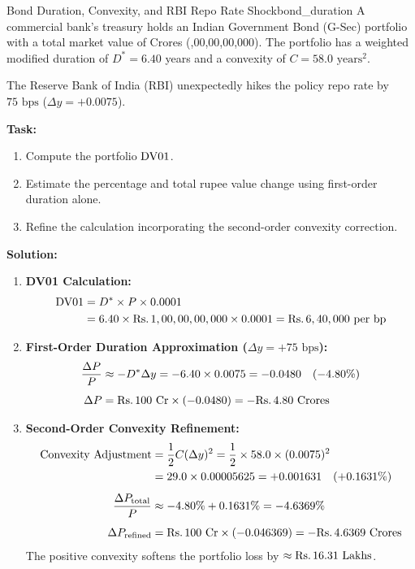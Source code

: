 \begin{example}{Bond Duration, Convexity, and RBI Repo Rate Shock}{bond_duration}
A commercial bank's treasury holds an Indian Government Bond (G-Sec) portfolio with a total market value of  Crores (,00,00,00,000). The portfolio has a weighted modified duration of $D^* = 6.40$ years and a convexity of $C = 58.0 \text{ years}^2$.

The Reserve Bank of India (RBI) unexpectedly hikes the policy repo rate by $75 \text{ bps}$ ($\Delta y = +0.0075$).

\textbf{Task:}
\begin{enumerate}[leftmargin=1.2em, itemsep=2pt]
    \item Compute the portfolio $\operatorname{DV01}$.
    \item Estimate the percentage and total rupee value change using first-order duration alone.
    \item Refine the calculation incorporating the second-order convexity correction.
\end{enumerate}

\textbf{Solution:}
\begin{enumerate}[leftmargin=1.2em, itemsep=2pt]
    \item \textbf{DV01 Calculation:}
    \begin{align*}
    \operatorname{DV01} &= D^* \times P \times 0.0001 \\
    &= 6.40 \times \text{Rs.}\, 1,00,00,00,000 \times 0.0001 = \text{Rs.}\, 6,40,000 \text{ per bp}
    \end{align*}
    \item \textbf{First-Order Duration Approximation ($\Delta y = +75 \text{ bps}$):}
    \begin{align*}
    \frac{\Delta P}{P} &\approx -D^* \Delta y = -6.40 \times 0.0075 = -0.0480 \quad (-4.80\%) \\[0.15cm]
    \Delta P &= \text{Rs.}\, 100 \text{ Cr} \times (-0.0480) = -\text{Rs.}\, 4.80 \text{ Crores}
    \end{align*}
    \item \textbf{Second-Order Convexity Refinement:}
    \begin{align*}
    \text{Convexity Adjustment} &= \frac{1}{2} C (\Delta y)^2 = \frac{1}{2} \times 58.0 \times (0.0075)^2 \\
    &= 29.0 \times 0.00005625 = +0.001631 \quad (+0.1631\%) \\[0.15cm]
    \frac{\Delta P_{\text{total}}}{P} &\approx -4.80\% + 0.1631\% = -4.6369\% \\[0.15cm]
    \Delta P_{\text{refined}} &= \text{Rs.}\, 100 \text{ Cr} \times (-0.046369) = -\text{Rs.}\, 4.6369 \text{ Crores}
    \end{align*}
    The positive convexity softens the portfolio loss by $\approx \text{Rs.}\, 16.31 \text{ Lakhs}$.
\end{enumerate}
\end{example}

